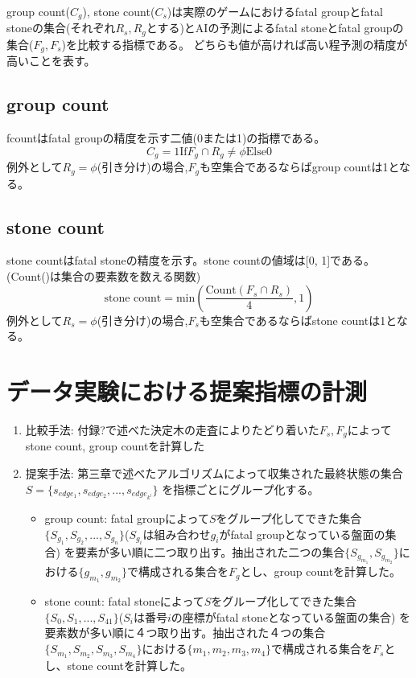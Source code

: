 group count($C_g$), stone count($C_s$)は実際のゲームにおけるfatal groupとfatal stoneの集合(それぞれ$R_s, R_g$とする)とAIの予測によるfatal stoneとfatal groupの集合($F_g, F_s$)を比較する指標である。
どちらも値が高ければ高い程予測の精度が高いことを表す。
\subsection{group count}
fcountはfatal groupの精度を示す二値(0または1)の指標である。
\begin{equation}
	{C_g = 1 \textrm{If} F_g \cap R_g \ne \phi \textrm{Else} 0}
\end{equation}
例外として$R_g=\phi$(引き分け)の場合,$F_g$も空集合であるならばgroup countは1となる。
\subsection{stone count}
stone countはfatal stoneの精度を示す。stone countの値域は[0, 1]である。
(Count()は集合の要素数を数える関数)
\begin{equation}
	{\textrm{stone count} = \textrm{min}(\frac{\textrm{Count}(F_s \cap R_s)}{4}, 1)  }
\end{equation}
例外として$R_s=\phi$(引き分け)の場合,$F_s$も空集合であるならばstone countは1となる。
\section{データ実験における提案指標の計測}

\begin{enumerate}
	\item 比較手法: 付録?で述べた決定木の走査によりたどり着いた$F_s, F_g$によってstone count, group countを計算した
	\item 提案手法: 第三章で述べたアルゴリズムによって収集された最終状態の集合$S=\{s_{edge_1}, s_{edge_2}, ..., s_{edge_{k^l}}\}$
	    を指標ごとにグループ化する。
		\begin{itemize}
			\item group count: fatal groupによって$S$をグループ化してできた集合$\{S_{g_1}, S_{g_2}, ..., S_{g_n}\}$($S_{g_i}$は組み合わせ$g_i$がfatal groupとなっている盤面の集合)
			を要素が多い順に二つ取り出す。抽出された二つの集合$\{S_{g_{m_1}}, S_{g_{m_2}}\}$における$\{g_{m_1}, g_{m_2}\}$で構成される集合を$F_g$とし、group countを計算した。
			\item stone count: fatal stoneによって$S$をグループ化してできた集合$\{S_0, S_1, ..., S_41\}$($S_i$は番号$i$の座標がfatal stoneとなっている盤面の集合)
			を要素数が多い順に４つ取り出す。抽出された４つの集合$\{S_{m_1}, S_{m_2}, S_{m_3}, S_{m_4}\}$における$\{m_1, m_2, m_3, m_4\}$で構成される集合を$F_s$とし、stone countを計算した。
		\end{itemize}
		
\end{enumerate}

